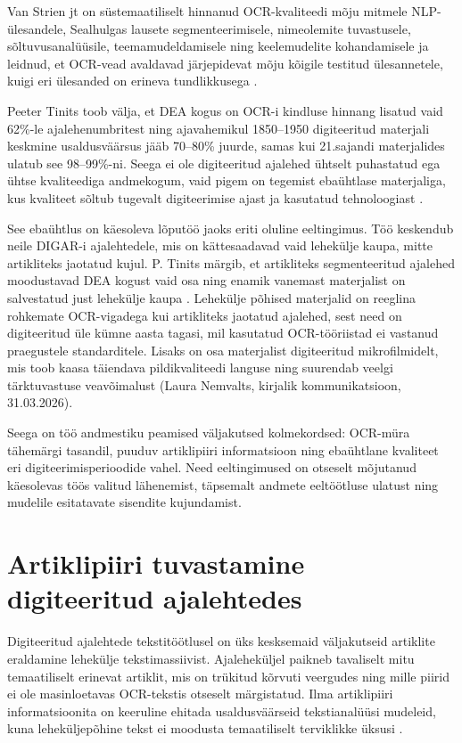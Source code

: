 Van Strien jt on süstemaatiliselt hinnanud OCR-kvaliteedi mõju mitmele NLP-ülesandele, Sealhulgas lausete segmenteerimisele, nimeolemite tuvastusele, sõltuvusanalüüsile, teemamudeldamisele ning keelemudelite kohandamisele ja leidnud, et OCR-vead avaldavad järjepidevat mõju kõigile testitud ülesannetele, kuigi eri ülesanded on erineva tundlikkusega \cite{vanstrien2020}.

Peeter Tinits toob välja, et DEA kogus on OCR-i kindluse hinnang lisatud vaid 62\%-le ajalehenumbritest ning ajavahemikul 1850--1950 digiteeritud materjali keskmine usaldusväärsus jääb 70--80\% juurde, samas kui 21.sajandi materjalides ulatub see 98--99\%-ni. Seega ei ole digiteeritud ajalehed ühtselt puhastatud ega ühtse kvaliteediga andmekogum, vaid pigem on tegemist ebaühtlase materjaliga, kus kvaliteet sõltub tugevalt digiteerimise ajast ja kasutatud tehnoloogiast \cite[lk~99--101]{tinits2025}.

See ebaühtlus on käesoleva lõputöö jaoks eriti oluline eeltingimus. Töö keskendub neile DIGAR-i ajalehtedele, mis on kättesaadavad vaid lehekülje kaupa, mitte artikliteks jaotatud kujul. P. Tinits märgib, et artikliteks segmenteeritud ajalehed moodustavad DEA kogust vaid osa ning enamik vanemast materjalist on salvestatud just lehekülje kaupa \cite[lk~102--103]{tinits2025}. Lehekülje põhised materjalid on reeglina rohkemate OCR-vigadega kui artikliteks jaotatud ajalehed, sest need on digiteeritud üle kümne aasta tagasi, mil kasutatud OCR-tööriistad ei vastanud praegustele standarditele. Lisaks on osa materjalist digiteeritud mikrofilmidelt, mis toob kaasa täiendava pildikvaliteedi languse ning suurendab veelgi tärktuvastuse veavõimalust (Laura Nemvalts, kirjalik kommunikatsioon, 31.03.2026).

Seega on töö andmestiku peamised väljakutsed kolmekordsed: OCR-müra tähemärgi tasandil, puuduv artiklipiiri informatsioon ning ebaühtlane kvaliteet eri digiteerimisperioodide vahel. Need eeltingimused on otseselt mõjutanud käesolevas töös valitud lähenemist, täpsemalt andmete eeltöötluse ulatust ning mudelile esitatavate sisendite kujundamist.

\section{Artiklipiiri tuvastamine digiteeritud ajalehtedes}\label{sec:third-section}
Digiteeritud ajalehtede tekstitöötlusel on üks kesksemaid väljakutseid artiklite eraldamine lehekülje tekstimassiivist. Ajaleheküljel paikneb tavaliselt mitu temaatiliselt erinevat artiklit, mis on trükitud kõrvuti veergudes ning mille piirid ei ole masinloetavas OCR-tekstis otseselt märgistatud. Ilma artiklipiiri informatsioonita on keeruline ehitada usaldusväärseid tekstianalüüsi mudeleid, kuna leheküljepõhine tekst ei moodusta temaatiliselt terviklikke üksusi \cite[lk~102]{tinits2025}.

